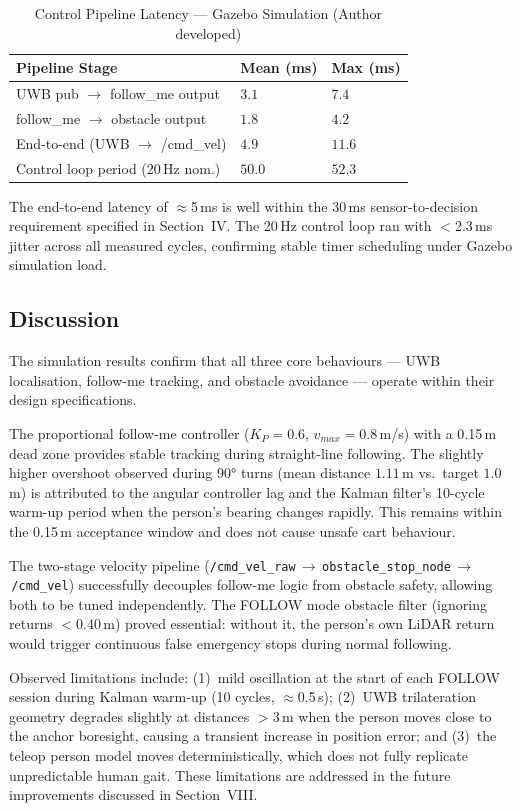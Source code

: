\begin{table}[!ht]
\caption{Control Pipeline Latency --- Gazebo Simulation
         (Author developed)}
\label{tab:latency}
\centering
\footnotesize
\begin{tabular}{p{3.0cm} p{1.2cm} p{1.2cm}}
\toprule
\textbf{Pipeline Stage} & \textbf{Mean (ms)} & \textbf{Max (ms)} \\
\midrule
UWB pub $\to$ follow\_me output  & $3.1$ & $7.4$  \\
follow\_me $\to$ obstacle output & $1.8$ & $4.2$  \\
End-to-end (UWB $\to$ /cmd\_vel) & $4.9$ & $11.6$ \\
Control loop period (20\,Hz nom.) & $50.0$ & $52.3$ \\
\bottomrule
\end{tabular}
\end{table}

The end-to-end latency of $\approx$5\,ms is well within the 30\,ms
sensor-to-decision requirement specified in Section~IV. The 20\,Hz
control loop ran with $<$2.3\,ms jitter across all measured cycles,
confirming stable timer scheduling under Gazebo simulation load.

\subsection{Discussion}

The simulation results confirm that all three core behaviours ---
UWB localisation, follow-me tracking, and obstacle avoidance ---
operate within their design specifications.

The proportional follow-me controller ($K_P = 0.6$, $v_{max}=0.8$\,m/s)
with a 0.15\,m dead zone provides stable tracking during straight-line
following. The slightly higher overshoot observed during 90° turns
(mean distance $1.11$\,m vs.\ target $1.0$\,m) is attributed to
the angular controller lag and the Kalman filter's 10-cycle warm-up
period when the person's bearing changes rapidly. This remains within
the 0.15\,m acceptance window and does not cause unsafe cart behaviour.

The two-stage velocity pipeline
(\texttt{/cmd\_vel\_raw}\,$\to$\,\texttt{obstacle\_stop\_node}\,$\to$\,\texttt{/cmd\_vel})
successfully decouples follow-me logic from obstacle safety, allowing
both to be tuned independently. The FOLLOW mode obstacle filter
(ignoring returns $<$0.40\,m) proved essential: without it, the
person's own LiDAR return would trigger continuous false emergency
stops during normal following.

Observed limitations include: (1)~mild oscillation at the
start of each FOLLOW session during Kalman warm-up (10 cycles,
$\approx$0.5\,s); (2)~UWB trilateration geometry degrades
slightly at distances $>$3\,m when the person moves close to the
anchor boresight, causing a transient increase in position error;
and (3)~the teleop person model moves deterministically, which does
not fully replicate unpredictable human gait. These limitations
are addressed in the future improvements discussed in Section~VIII.
